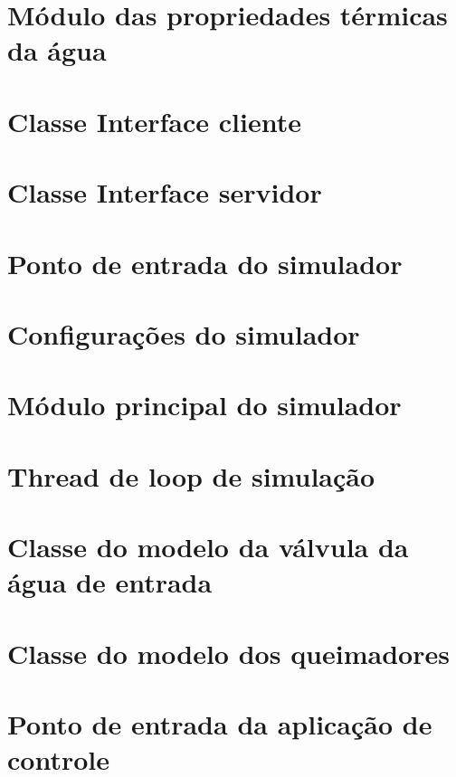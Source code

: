 \chapter{\label{prop_termicas}Módulo das propriedades térmicas da água}

\chapter{\label{interface_cliente}Classe Interface cliente}

\chapter{\label{interface_servidor}Classe Interface servidor}

\chapter{\label{sim_main}Ponto de entrada do simulador}

\chapter{\label{sim_config}Configurações do simulador}

\chapter{\label{sim_caldeira}Módulo principal do simulador}

\chapter{\label{sim_thread}Thread de loop de simulação}

\chapter{\label{sim_valvula}Classe do modelo da válvula da água de entrada}

\chapter{\label{sim_queimador}Classe do modelo dos queimadores}

\chapter{\label{controllers_main}Ponto de entrada da aplicação de controle}

